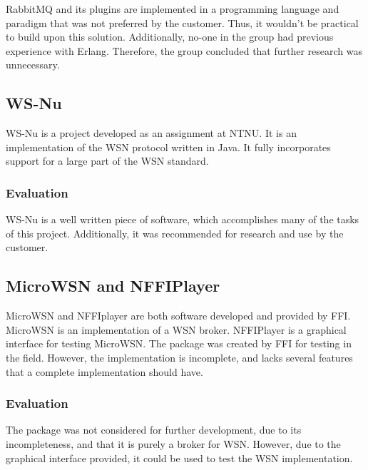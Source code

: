 RabbitMQ and its plugins are implemented in a programming language and paradigm that was not preferred by the customer. Thus, it wouldn't be practical to build upon this solution. Additionally, no-one in the group had previous experience with Erlang. Therefore, the group concluded that further research was unnecessary.

\subsection{WS-Nu}
\label{subsec:prestudies-existing_solutions-ws_nu}

WS-Nu is a project developed as an assignment at NTNU. It is an implementation of the WSN protocol written in Java. It fully incorporates support for a large part of the WSN standard.

\subsubsection{Evaluation}
\label{subsec:prestudies-existing_solution-ws_nu-evaluation}

WS-Nu is a well written piece of software, which accomplishes many of the tasks of this project. Additionally, it was recommended for research and use by the customer.

\subsection{MicroWSN and NFFIPlayer}
\label{subsec:prestudies-existing_solutions-micro_wsn_and_nffiplayer}

MicroWSN and NFFIplayer are both software developed and provided by FFI. MicroWSN is an implementation of a WSN broker. NFFIPlayer is a graphical interface for testing MicroWSN. The package was created by FFI for testing in the field. However, the implementation is incomplete, and lacks several features that a complete implementation should have.

\subsubsection{Evaluation}
\label{subsec:prestudies-existing_solutions-micro_wsn_and_nffiplayer-evaluation}

The package was not considered for further development, due to its incompleteness, and that it is purely a broker for WSN. However, due to the graphical interface provided, it could be used to test the WSN implementation.

